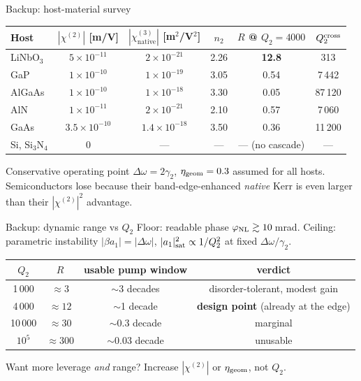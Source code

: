 \documentclass[aspectratio=169,10pt]{beamer}
\newcommand{\chitwo}{\chi^{(2)}}
\newcommand{\chinat}{\chi^{(3)}_{\mathrm{native}}}
\newcommand{\Dom}{\Delta\omega}
\newcommand{\gtwo}{\gamma_2}
\begin{document}
\begin{frame}{Backup: host-material survey}
  \small
  \begin{table}
  \begin{tabular}{@{}lccccc@{}}
    \toprule
    Host & $|\chitwo|$ [m/V] & $|\chinat|$ [m$^2$/V$^2$] & $n_2$ & $R$ @ $Q_2{=}4000$ & $Q_2^{\rm cross}$ \\
    \midrule
    LiNbO$_3$ & $5\times10^{-11}$   & $2\times10^{-21}$   & 2.26 & \textbf{12.8} & 313 \\
    GaP       & $1\times10^{-10}$   & $1\times10^{-19}$   & 3.05 & 0.54 & 7\,442 \\
    AlGaAs    & $1\times10^{-10}$   & $1\times10^{-18}$   & 3.30 & 0.05 & 87\,120 \\
    AlN       & $1\times10^{-11}$   & $2\times10^{-21}$   & 2.10 & 0.57 & 7\,060 \\
    GaAs      & $3.5\times10^{-10}$ & $1.4\times10^{-18}$ & 3.50 & 0.36 & 11\,200 \\
    Si, Si$_3$N$_4$ & 0 & --- & --- & --- (no cascade) & --- \\
    \bottomrule
  \end{tabular}
  \end{table}
  \vspace{4pt}
  Conservative operating point $\Dom = 2\gtwo$, $\eta_{\rm geom}=0.3$ assumed for all hosts.
  Semiconductors lose because their band-edge-enhanced \emph{native} Kerr is even larger
  than their $|\chitwo|^2$ advantage.
\end{frame}

\begin{frame}{Backup: dynamic range vs $Q_2$}
  \small
  Floor: readable phase $\varphi_{\rm NL}\gtrsim10$\,mrad. Ceiling: parametric
  instability $|\beta a_1| = |\Dom|$, $|a_1|^2_{\rm sat}\propto 1/Q_2^2$ at fixed
  $\Dom/\gtwo$.
  \begin{table}
  \begin{tabular}{@{}cccc@{}}
    \toprule
    $Q_2$ & $R$ & usable pump window & verdict \\
    \midrule
    1\,000  & $\approx3$   & $\sim$3 decades   & disorder-tolerant, modest gain \\
    4\,000  & $\approx12$  & $\sim$1 decade    & \textbf{design point} (already at the edge) \\
    10\,000 & $\approx30$  & $\sim$0.3 decade  & marginal \\
    $10^5$  & $\approx300$ & $\sim$0.03 decade & unusable \\
    \bottomrule
  \end{tabular}
  \end{table}
  \vspace{4pt}
  Want more leverage \emph{and} range? Increase $|\chitwo|$ or $\eta_{\rm geom}$,
  not $Q_2$.
\end{frame}
\end{document}
